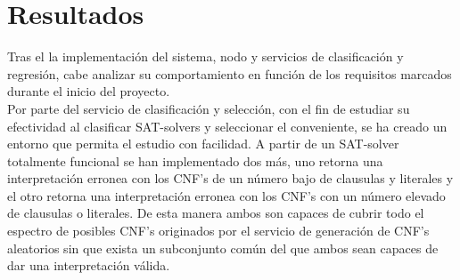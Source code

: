 \documentclass[11pt]{article}
\begin{document}
	\section{Resultados}
		Tras el la implementación del sistema, nodo y servicios de clasificación y regresión, cabe analizar su comportamiento en función de los
		requisitos marcados durante el inicio del proyecto. \\

		Por parte del servicio de clasificación y selección, con el fin de estudiar su efectividad al clasificar SAT-solvers y seleccionar el conveniente, se 
		ha creado un entorno que permita el estudio con facilidad. A partir de un SAT-solver totalmente funcional se han implementado dos más, uno retorna una interpretación
		erronea con los CNF's de un número bajo de clausulas y literales y el otro retorna una interpretación erronea con los CNF's con un número elevado de clausulas o literales.
		De esta manera ambos son capaces de cubrir todo el espectro de posibles CNF's originados por el servicio de generación de CNF's aleatorios sin que exista un subconjunto común
		del que ambos sean capaces de dar una interpretación válida. \\
\end{document}
